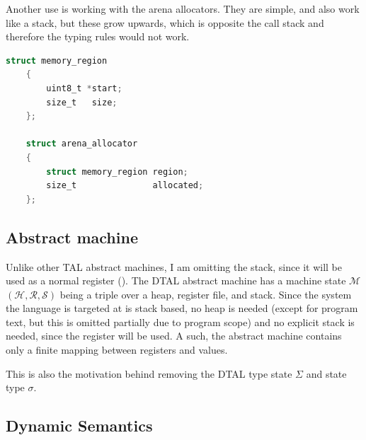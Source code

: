Another use is working with the arena allocators. They are simple, and also
work like a stack, but these grow upwards, which is opposite the call stack and
therefore the typing rules would not work.

\begin{lstlisting}[language=C, gobble=4]
    struct memory_region
    {
        uint8_t *start;
        size_t   size;
    };

    struct arena_allocator
    {
        struct memory_region region;
        size_t               allocated;
    };
\end{lstlisting}




\subsection{Abstract machine}
    Unlike other TAL abstract machines, I am omitting the stack, since it will
    be used as a normal register ().
    The DTAL abstract machine has a machine state $\mathcal M$ $(\mathcal H,
    \mathcal R, \mathcal S)$ being a triple over a heap, register file, and
    stack.
    Since the system the language is targeted at is stack based, no heap is
    needed (except for program text, but this is omitted partially due to
    program scope) and no explicit stack is needed, since the register 
    will be used.
    A such, the abstract machine contains only a finite mapping
    between registers and values.

    This is also the motivation behind removing the DTAL type state $\Sigma$
    and state type $\sigma$.

\subsection{Dynamic Semantics}

